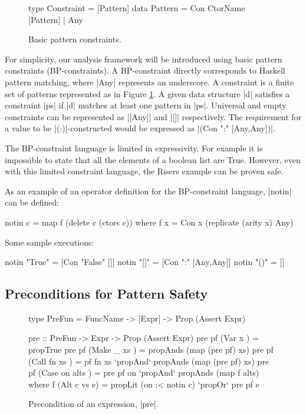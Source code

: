 \documentclass[preprint]{sigplanconf}
\begin{document}
\begin{figure}
\begin{code}
type Constraint  =  [Pattern]
data Pattern     =  Con CtorName [Pattern] | Any
\end{code}
\caption{Basic pattern constraints.}
\label{fig:basic}
\end{figure}

For simplicity, our analysis framework will be introduced using basic pattern constraints (BP-constraints). A BP-constraint directly corresponds to Haskell pattern matching, where |Any| represents an underscore. A constraint is a finite set of patterns represented as in Figure \ref{fig:basic}. A given data structure |d| satisfies a constraint |ps| if |d| matches at least one pattern in |ps|. Universal and empty constraints can be represented as |[Any]| and |[]| respectively. The requirement for a value to be |(:)|-constructed would be expressed as |(Con ":" [Any,Any])|.

The BP-constraint language is limited in expressivity. For example it is impossible to state that all the elements of a boolean list are True. However, even with this limited constraint language, the Risers example can be proven safe.

As an example of an operator definition for the BP-constraint language, |notin| can be defined:

\begin{code}
notin c = map f (delete c (ctors c))
   where f x = Con x (replicate (arity x) Any)
\end{code}

\noindent Some sample executions:

\begin{code}
notin "True"  = [Con "False" []]
notin "[]"    = [Con ":" [Any,Any]]
notin "()"    = []
\end{code}

\subsection{Preconditions for Pattern Safety}
\label{sec:precond}

\begin{figure}
\begin{code}
type PreFun = FuncName -> [Expr] -> Prop (Assert Expr)

pre :: PreFun -> Expr -> Prop (Assert Expr)
pre pf (Var   x         ) = propTrue
pre pf (Make  _   xs    ) = propAnds (map (pre pf) xs)
pre pf (Call  fn  xs    ) = pf fn xs `propAnd` propAnds (map (pre pf) xs)
pre pf (Case  on  alts  ) = pre pf on `propAnd` propAnds (map f alts)
    where f (Alt c vs e) = propLit (on :< notin c) `propOr` pre pf e
\end{code}
\caption{Precondition of an expression, |pre|.}
\label{fig:precondition}
\end{figure}
\end{document}
